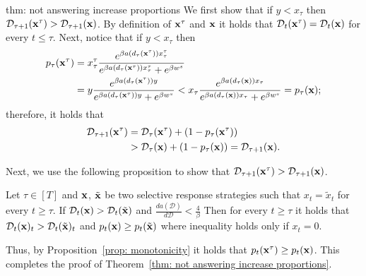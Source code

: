 \begin{proofof}{thm: not answering increase proportions}
We first show that if $y < x_\tau$ then $\mathcal{D}_{\tau + 1}({\bf{x}}^\tau) >\mathcal{D}_{\tau + 1}({\bf{x}})$. By definition of ${\bf{x}}^\tau$ and ${\bf{x}}$ it holds that $\mathcal{D}_t({\bf{x}}^\tau) = \mathcal{D}_t({\bf{x}})$ for every $t \leq \tau$.
Next, notice that if $y < x_\tau$ then
\begin{align*}
p_\tau({\bf{x}}^\tau) &= x_\tau^\tau \frac{e^{\beta a(d_\tau({\bf{x}}^\tau)) x^\tau_\tau}}{e^{\beta a(d_\tau({\bf{x}}^\tau)) x^\tau_\tau} + e^{\beta w^s}} \\
&= y \frac{e^{\beta a(d_\tau({\bf{x}}^\tau)) y}}{e^{\beta a(d_\tau({\bf{x}}^\tau)) y} + e^{\beta w^s}} < x_\tau \frac{e^{\beta a(d_\tau({\bf{x}})) x_\tau}}{e^{\beta a(d_\tau({\bf{x}})) x_\tau} + e^{\beta w^s}} = p_\tau({\bf{x}});
\end{align*}
therefore, it holds that
\begin{align*}
\mathcal{D}_{\tau + 1}({\bf{x}}^\tau) &= \mathcal{D}_{\tau}({\bf{x}}^\tau) + (1 - p_\tau({\bf{x}}^\tau)) \\
& > \mathcal{D}_{\tau}({\bf{x}}) + (1 - p_\tau({\bf{x}})) = \mathcal{D}_{\tau + 1}({\bf{x}}).
\end{align*}

Next, we use the following proposition to show that $\mathcal{D}_{\tau + 1}({\bf{x}}^\tau) >\mathcal{D}_{\tau + 1}({\bf{x}})$.

\begin{proposition} \label{prop: monotonicity}
Let $\tau \in [T]$ and ${\bf{x}}$, $\tilde{{\bf{x}}}$ be two selective response strategies such that $x_t = \tilde{x}_t$ for every $t \geq \tau$. If $\mathcal{D}_t({\bf{x}}) > \mathcal{D}_t(\tilde{{\bf{x}}})$ and $\frac{d a(\mathcal{D})}{d\mathcal{D}} < \frac{4}{\beta}$ Then for every $t \geq \tau$ it holds that $\mathcal{D}_t({\bf{x}})_t > \mathcal{D}_t(\tilde{{\bf{x}}})_t$ and $p_t({\bf{x}}) \geq p_t(\tilde{{\bf{x}}})$ where inequality holds only if $x_t = 0$.
\end{proposition}
Thus, by Proposition~\ref{prop: monotonicity} it holds that $p_t({\bf{x}}^\tau) \geq p_t({\bf{x}})$. This completes the proof of Theorem~\ref{thm: not answering increase proportions}.
\end{proofof}



